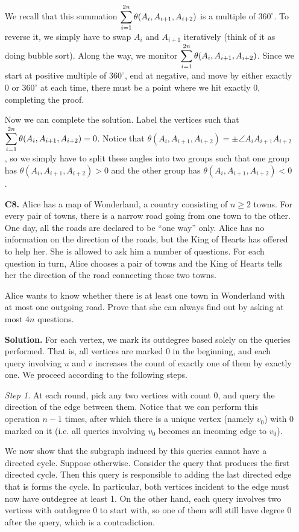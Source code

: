 \documentclass[11pt,a4paper]{article}
\begin{document}
\begin{enumerate}
	We recall that this summation $\displaystyle\sum_{i=1}^{2n}\theta(A_i, A_{i+1}, A_{i+2})$ is a multiple of $360^{\circ}$. To reverse it, we simply have to swap $A_i$ and $A_{i+1}$ iteratively (think of it as doing bubble sort). Along the way, we monitor $\displaystyle\sum_{i=1}^{2n}\theta(A_i, A_{i+1}, A_{i+2})$. Since we start at positive multiple of $360^{\circ}$, end at negative, and move by either exactly 0 or $360^{\circ}$ at each time, there must be a point where we hit exactly 0, completing the proof. 
	
	Now we can complete the solution. Label the vertices such that $\displaystyle\sum_{i=1}^{2n}\theta(A_i, A_{i+1}, A_{i+2})=0$. Notice that $\theta(A_i, A_{i+1}, A_{i+2})=\pm \angle A_iA_{i+1}A_{i+2}$, so we simply have to split these angles into two groups such that one group has $\theta(A_i, A_{i+1}, A_{i+2})>0$ and the other group has $\theta(A_i, A_{i+1}, A_{i+2})<0$. 
	
	\item [\textbf{C8.}] Alice has a map of Wonderland, a country consisting of $n \geq 2$ towns. For every pair of towns, there is a narrow road going from one town to the other. One day, all the roads are declared to be “one way” only. Alice has no information on the direction of the roads, but the King of Hearts has offered to help her. She is allowed to ask him a number of questions. For each question in turn, Alice chooses a pair of towns and the King of Hearts tells her the direction of the road connecting those two towns.
	
	Alice wants to know whether there is at least one town in Wonderland with at most one outgoing road. Prove that she can always find out by asking at most $4n$ questions.
	
	\textbf{Solution.} 
	For each vertex, we mark its outdegree based solely on the queries performed. 
	That is, all vertices are marked 0 in the beginning, 
	and each query involving $u$ and $v$ increases the count of exactly one of them by exactly one. 
	We proceed according to the following steps. 
	
	\emph{Step 1.} 
	At each round, pick any two vertices with count 0, and query the direction of the edge between them. 
	Notice that we can perform this operation $n - 1$ times, after which there is a unique vertex (namely $v_0$) with 0 marked on it 
	(i.e. all queries involving $v_0$ becomes an incoming edge to $v_0$). 
	
	We now show that the subgraph induced by this queries cannot have a directed cycle. 
	Suppose otherwise. Consider the query that produces the first directed cycle. 
	Then this query is responsible to adding the last directed edge that is forms the cycle. 
	In particular, both vertices incident to the edge must now have outdegree at least 1. 
	On the other hand, each query involves two vertices with outdegree 0 to start with, 
	so one of them will still have degree 0 after the query, which is a contradiction. 
	

\end{enumerate}
\end{document}
